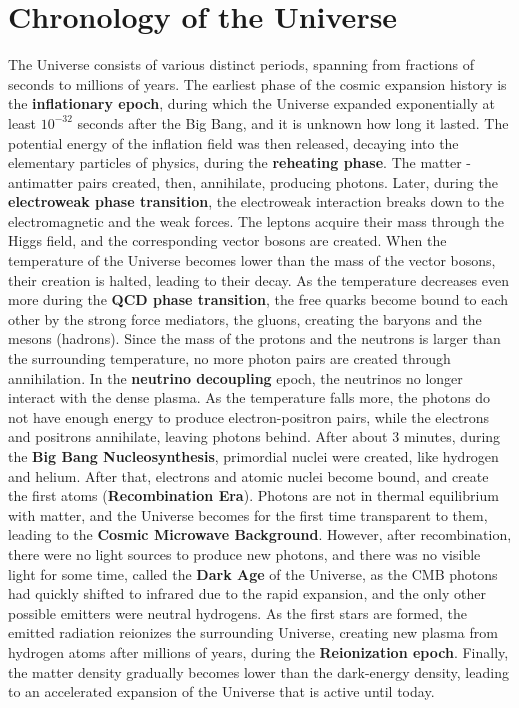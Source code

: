 \documentclass{book}
\begin{document}
	\section{Chronology of the Universe}
	The Universe consists of various distinct periods, spanning from fractions of seconds to millions of years. The earliest phase of the cosmic expansion history is the \textbf{inflationary epoch}, during which the Universe expanded exponentially at least $10^{-32}$ seconds after the Big Bang, and it is unknown how long it lasted. The potential energy of the  inflation field was then released, decaying into the elementary particles of physics, during the \textbf{reheating phase}. The matter - antimatter pairs created, then, annihilate, producing photons. Later, during the \textbf{electroweak phase transition}, the electroweak interaction breaks down to the electromagnetic and the weak forces. The leptons acquire their mass through the Higgs field, and the corresponding vector bosons are created. When the temperature of the Universe becomes lower than the mass of the vector bosons, their creation is halted, leading to their decay. As the temperature decreases even more during the \textbf{QCD phase transition}, the free quarks become bound to each other by the strong force mediators, the gluons, creating the baryons and the mesons (hadrons). Since the mass of the protons and the neutrons is larger than the surrounding temperature, no more photon pairs are created through annihilation. In the \textbf{neutrino decoupling} epoch, the neutrinos no longer interact with the dense plasma. As the temperature falls more, the photons do not have enough energy to produce electron-positron pairs, while the electrons and positrons annihilate, leaving photons behind. After about 3 minutes, during the \textbf{Big Bang Nucleosynthesis}, primordial nuclei were created, like hydrogen and helium. After that, electrons and atomic nuclei become bound, and create the first atoms (\textbf{Recombination Era}). Photons are not in thermal equilibrium with matter, and the Universe becomes for the first time transparent to them, leading to the \textbf{Cosmic Microwave Background}. However, after recombination, there were no light sources to produce new photons, and there was no visible light for some time, called the \textbf{Dark Age} of the Universe, as the CMB photons had quickly shifted to infrared due to the rapid expansion, and the only other possible emitters were neutral hydrogens. As the first stars are formed, the emitted radiation reionizes the surrounding Universe, creating new plasma from hydrogen atoms after millions of years, during the \textbf{Reionization epoch}. Finally, the matter density gradually becomes lower than the dark-energy density, leading to an accelerated expansion of the Universe that is active until today.
	
\end{document}
